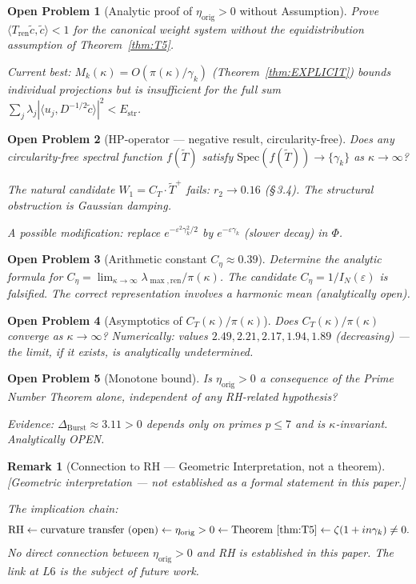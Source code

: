 \documentclass[11pt]{article}
\newtheorem*{remark}{Remark}
\newtheorem*{openproblem}{Open Problem}
\newcommand{\Estr}{E_{\mathrm{str}}}
\newcommand{\etaorig}{\eta_{\mathrm{orig}}}
\newcommand{\Tren}{T_{\mathrm{ren}}}
\newcommand{\Tt}{\widetilde{T}}
\newcommand{\Ceta}{C_{\eta}}
\newcommand{\CT}{C_{T}}
\newcommand{\Wone}{W_1}
\newcommand{\Dburstvar}{\Delta_{\mathrm{Burst}}}
\begin{document}
\begin{openproblem}[Analytic proof of $\etaorig > 0$ without Assumption]
Prove $\langle\Tren\tilde{c},\tilde{c}\rangle < 1$ for the canonical
weight system without the equidistribution assumption of
Theorem~\ref{thm:T5}.

Current best: $M_k(\kappa) = O(\pi(\kappa)/\gamma_k)$
(Theorem~\ref{thm:EXPLICIT}) bounds individual projections but is
insufficient for the full sum
$\sum_j\lambda_j|\langle u_j, D^{-1/2}\tilde{c}\rangle|^2 < \Estr$.
\end{openproblem}

\begin{openproblem}[HP-operator --- negative result, circularity-free]
Does any circularity-free spectral function $f(\Tt)$ satisfy
$\mathrm{Spec}(f(\Tt))\to\{\gamma_k\}$ as $\kappa\to\infty$?

The natural candidate $\Wone = \CT\cdot\Tt^+$ fails: $r_2\to 0.16$
(\S\,3.4). The structural obstruction is Gaussian damping.

A possible modification: replace $e^{-\varepsilon^2\gamma_k^2/2}$
by $e^{-\varepsilon\gamma_k}$ (slower decay) in $\Phi$.
\end{openproblem}

\begin{openproblem}[Arithmetic constant $\Ceta\approx 0.39$]
Determine the analytic formula for
$\Ceta = \lim_{\kappa\to\infty}\lambda_{\max,\mathrm{ren}}/\pi(\kappa)$.
The candidate $\Ceta = 1/I_N(\varepsilon)$ is falsified.
The correct representation involves a harmonic mean
(analytically open).
\end{openproblem}

\begin{openproblem}[Asymptotics of $\CT(\kappa)/\pi(\kappa)$]
Does $\CT(\kappa)/\pi(\kappa)$ converge as $\kappa\to\infty$?
Numerically: values $2.49, 2.21, 2.17, 1.94, 1.89$ (decreasing) ---
the limit, if it exists, is analytically undetermined.
\end{openproblem}

\begin{openproblem}[Monotone bound]
Is $\etaorig > 0$ a consequence of the Prime Number Theorem alone,
independent of any RH-related hypothesis?

Evidence: $\Dburstvar\approx 3.11 > 0$ depends only on primes
$p\leq 7$ and is $\kappa$-invariant.
Analytically OPEN.
\end{openproblem}

\begin{remark}[Connection to RH --- Geometric Interpretation, not a theorem]
\emph{[Geometric interpretation --- not established as a formal
statement in this paper.]}

The implication chain:
\[
\mathrm{RH} \leftarrow \text{curvature transfer (open)}
\leftarrow \etaorig > 0
\leftarrow \text{Theorem~\ref{thm:T5}}
\leftarrow \zeta(1+in\gamma_k)\neq 0.
\]
No direct connection between $\etaorig > 0$ and RH is established
in this paper. The link at $L6$ is the subject of future work.
\end{remark}
\end{document}
